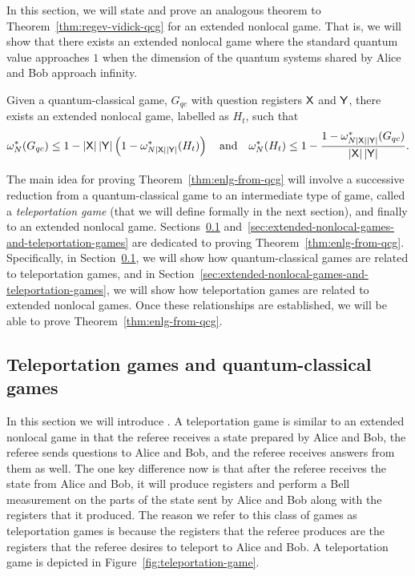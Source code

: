 In this section, we will state and prove an analogous theorem to Theorem~\ref{thm:regev-vidick-qcg} for an extended nonlocal game. That is, we will show that there exists an extended nonlocal game where the standard quantum value approaches $1$ when the dimension of the quantum systems shared by Alice and Bob approach infinity. 
\begin{theorem} \label{thm:enlg-from-qcg}
	Given a quantum-classical game, $G_{qc}$ with question registers $\mathsf{X}$ and $\mathsf{Y}$, there exists an extended nonlocal game, labelled as $H_t$, such that
	\begin{align} \label{eq:enlg-from-qcg}
		\omega_N^*(G_{qc}) \leq 1 - \left\lvert \mathsf{X} \right\rvert \left\lvert \mathsf{Y} \right\rvert \left( 1- \omega^*_{N \left\lvert \mathsf{X} \right\rvert \left\lvert \mathsf{Y} \right\rvert}(H_t) \right) \quad \textnormal{and} \quad \omega_N^*(H_t) \leq 1 - \frac{ 1 - \omega^*_{N \left\lvert \mathsf{X} \right\rvert \left\lvert \mathsf{Y} \right\rvert}(G_{qc}) }{\left\lvert \mathsf{X} \right\rvert \left\lvert \mathsf{Y} \right\rvert}.
	\end{align}
\end{theorem}
The main idea for proving Theorem~\ref{thm:enlg-from-qcg} will involve a successive reduction from a quantum-classical game to an intermediate type of game, called a \emph{teleportation game} (that we will define formally in the next section), and finally to an extended nonlocal game. Sections~\ref{sec:teleportation-games-and-quantum-classical-games} and~\ref{sec:extended-nonlocal-games-and-teleportation-games} are dedicated to proving Theorem~\ref{thm:enlg-from-qcg}. Specifically, in Section~\ref{sec:teleportation-games-and-quantum-classical-games}, we will show how quantum-classical games are related to teleportation games, and in Section~\ref{sec:extended-nonlocal-games-and-teleportation-games}, we will show how teleportation games are related to extended nonlocal games. Once these relationships are established, we will be able to prove Theorem~\ref{thm:enlg-from-qcg}.

\subsection{Teleportation games and quantum-classical games} \label{sec:teleportation-games-and-quantum-classical-games}

In this section we will introduce . A teleportation game is similar to an extended nonlocal game in that the referee receives a state prepared by Alice and Bob, the referee sends questions to Alice and Bob, and the referee receives answers from them as well. The one key difference now is that after the referee receives the state from Alice and Bob, it will produce registers and perform a Bell measurement on the parts of the state sent by Alice and Bob along with the registers that it produced. The reason we refer to this class of games as teleportation games is because the registers that the referee produces are the registers that the referee desires to teleport to Alice and Bob. A teleportation game is depicted in Figure~\ref{fig:teleportation-game}.

